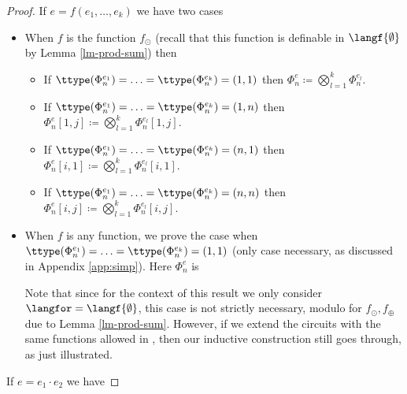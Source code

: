 \begin{proof}
If $e=f(e_1, \ldots, e_k)$ we have two cases

\begin{itemize}
  \item When $f$ is the function $f_{\odot}$ (recall that this function is definable in $\langf{\emptyset}$ by Lemma \ref{lm-prod-sum}) then
  \begin{itemize}
    \item If $\ttype(\Phi^{e_1}_n)=\ldots =\ttype(\Phi^{e_k}_n)=(1, 1)$ then $\Phi^e_n\coloneqq \bigotimes_{l=1}^k \Phi^{e_l}_n$.
    \item If $\ttype(\Phi^{e_1}_n)=\ldots =\ttype(\Phi^{e_k}_n)=(1, n)$ then $\Phi^e_n[1,j]\coloneqq \bigotimes_{l=1}^k \Phi^{e_l}_n[1,j]$.
    \item If $\ttype(\Phi^{e_1}_n)=\ldots =\ttype(\Phi^{e_k}_n)=(n, 1)$ then $\Phi^e_n[i,1]\coloneqq \bigotimes_{l=1}^k \Phi^{e_l}_n[i,1]$.
    \item If $\ttype(\Phi^{e_1}_n)=\ldots =\ttype(\Phi^{e_k}_n)=(n, n)$ then $\Phi^e_n[i,j]\coloneqq \bigotimes_{l=1}^k \Phi^{e_l}_n[i,j]$.
  \end{itemize}
	\item When $f$ is any function, we prove the case when $\ttype(\Phi^{e_1}_n)=\ldots =\ttype(\Phi^{e_k}_n)=(1, 1)$
  (only case necessary, as discussed in Appendix \ref{app:simp}). Here $\Phi^e_n$ is 
	
\begin{center}
\end{center}

Note that since for the context of this result we only consider $\langfor = \langf{\emptyset}$, this case is not strictly necessary, modulo for $f_\odot,f_\oplus$ due to Lemma \ref{lm-prod-sum}. However, if we extend the circuits with the same functions allowed in \langfor, then our inductive construction still goes through, as just illustrated.

\end{itemize}

If $e=e_1\cdot e_2$ we have


\end{proof}
